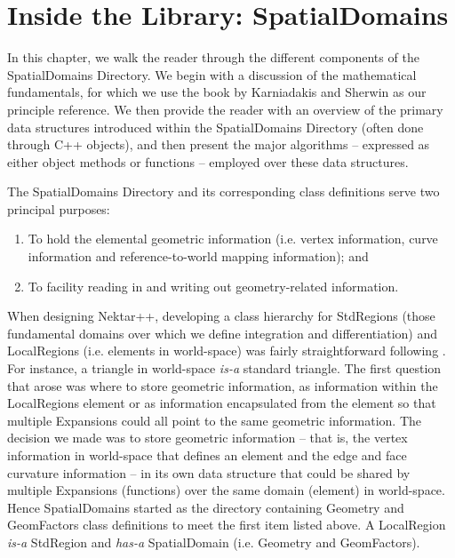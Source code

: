 






\chapter{Inside the Library: SpatialDomains}
\label{chap:spatialdomains}


In this chapter, we walk the reader through the different components
of the SpatialDomains Directory.  We begin with a discussion of the
mathematical fundamentals, for which we use the book by Karniadakis
and Sherwin \cite{KaSh05} as our principle reference.  We then provide
the reader with an overview of the primary data structures introduced
within the SpatialDomains Directory (often done through C++ objects),
and then present the major algorithms -- expressed as either object
methods or functions -- employed over these data structures.


The SpatialDomains Directory and its corresponding class definitions serve two principal purposes:
\begin{enumerate}
\item To hold the elemental geometric information (i.e. vertex information, curve information and reference-to-world mapping information); and
\item To facility reading in and writing out geometry-related information.
\end{enumerate}

When designing Nektar++, developing a class hierarchy for StdRegions
(those fundamental domains over which we define integration and
differentiation) and LocalRegions (i.e. elements in world-space) was
fairly straightforward following \cite{KaSh05}.  For instance, a
triangle in world-space {\em is-a} standard triangle.  The first
question that arose was where to store geometric information, as
information within the LocalRegions element or as information
encapsulated from the element so that multiple Expansions could all
point to the same geometric information.  The decision we made was to
store geometric information -- that is, the vertex information in
world-space that defines an element and the edge and face curvature
information -- in its own data structure that could be shared by
multiple Expansions (functions) over the same domain (element) in
world-space.  Hence SpatialDomains started as the directory containing
Geometry and GeomFactors class definitions to meet the first item
listed above.  A LocalRegion {\em is-a} StdRegion and {\em has-a}
SpatialDomain (i.e. Geometry and GeomFactors).

